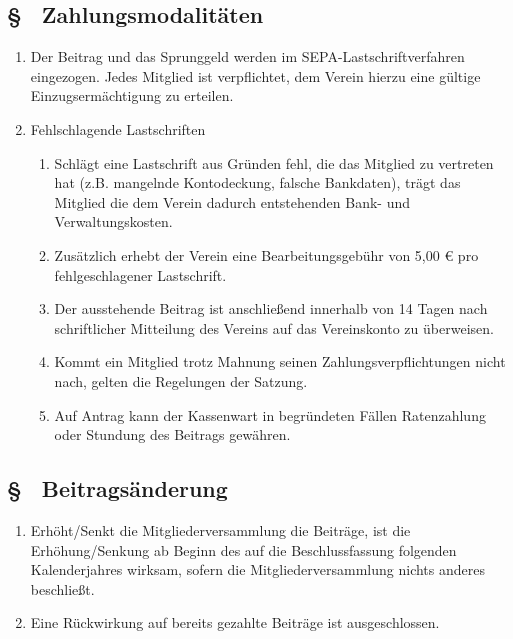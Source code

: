 \subsection{§ \theboparagraphcounter\ Zahlungsmodalitäten} \label{bo:par:zahlungsmodalitaeten}
\begin{enumerate}
    \item \label{bo:abs:0dsvko} Der Beitrag und das Sprunggeld werden im SEPA-Lastschriftverfahren eingezogen. Jedes Mitglied ist verpflichtet, dem Verein hierzu eine gültige Einzugsermächtigung zu erteilen.

    \item \label{bo:abs:j3l19p} Fehlschlagende Lastschriften
    \begin{enumerate}
        \item Schlägt eine Lastschrift aus Gründen fehl, die das Mitglied zu vertreten hat (z.B. mangelnde Kontodeckung, falsche Bankdaten), trägt das Mitglied die dem Verein dadurch entstehenden Bank- und Verwaltungskosten.

        \item Zusätzlich erhebt der Verein eine Bearbeitungsgebühr von 5,00 € pro fehlgeschlagener Lastschrift.

        \item Der ausstehende Beitrag ist anschließend innerhalb von 14 Tagen nach schriftlicher Mitteilung des Vereins auf das Vereinskonto zu überweisen.

        \item Kommt ein Mitglied trotz Mahnung seinen Zahlungsverpflichtungen nicht nach, gelten die Regelungen der Satzung.

        \item Auf Antrag kann der Kassenwart in begründeten Fällen Ratenzahlung oder Stundung des Beitrags gewähren.
    \end{enumerate}
\end{enumerate}

\subsection{§ \theboparagraphcounter\ Beitragsänderung} \label{bo:par:beitragsaenderung}
\begin{enumerate}
    \item \label{bo:abs:6lv8zl} Erhöht/Senkt die Mitgliederversammlung die Beiträge, ist die Erhöhung/Senkung ab Beginn des auf die Beschlussfassung folgenden Kalenderjahres wirksam, sofern die Mitgliederversammlung nichts anderes beschließt.

    \item \label{bo:abs:xgnm78} Eine Rückwirkung auf bereits gezahlte Beiträge ist ausgeschlossen.
\end{enumerate}

